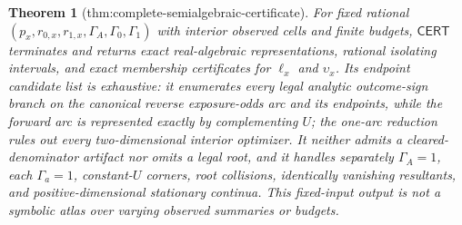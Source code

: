 \documentclass{article}
\newtheorem{theorem}{Theorem}
\begin{document}
\begin{theorem}[thm:complete-semialgebraic-certificate]\label{thm:complete-semialgebraic-certificate}
For fixed rational \((p_x,r_{0,x},r_{1,x},\Gamma_A,\Gamma_0,\Gamma_1)\) with interior observed cells and finite budgets, \(\mathsf{CERT}\) terminates and returns exact real-algebraic representations, rational isolating intervals, and exact membership certificates for \(\ell_x\) and \(\upsilon_x\).  Its endpoint candidate list is exhaustive: it enumerates every legal analytic outcome-sign branch on the canonical reverse exposure-odds arc and its endpoints, while the forward arc is represented exactly by complementing \(U\); the one-arc reduction rules out every two-dimensional interior optimizer.  It neither admits a cleared-denominator artifact nor omits a legal root, and it handles separately \(\Gamma_A=1\), each \(\Gamma_a=1\), constant-\(U\) corners, root collisions, identically vanishing resultants, and positive-dimensional stationary continua.  This fixed-input output is not a symbolic atlas over varying observed summaries or budgets.
\end{theorem}
\end{document}
